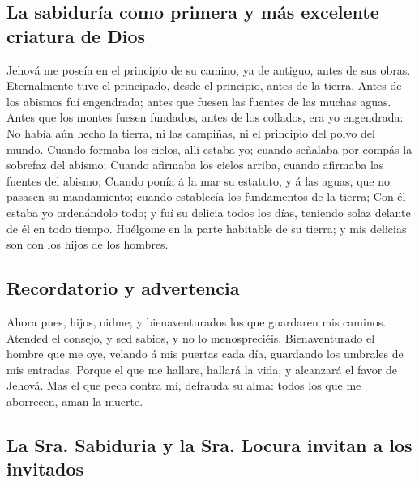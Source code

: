 \hypertarget{la-sabiduruxeda-como-primera-y-muxe1s-excelente-criatura-de-dios}{%
\subsection{La sabiduría como primera y más excelente criatura de
Dios}\label{la-sabiduruxeda-como-primera-y-muxe1s-excelente-criatura-de-dios}}

 Jehová me poseía en el principio de su camino, ya de
antiguo, antes de sus obras.  Eternalmente tuve el
principado, desde el principio, antes de la tierra. 
Antes de los abismos fuí engendrada; antes que fuesen las fuentes de las
muchas aguas.  Antes que los montes fuesen fundados,
antes de los collados, era yo engendrada:  No había aún
hecho la tierra, ni las campiñas, ni el principio del polvo del mundo.
 Cuando formaba los cielos, allí estaba yo; cuando
señalaba por compás la sobrefaz del abismo;  Cuando
afirmaba los cielos arriba, cuando afirmaba las fuentes del abismo;
 Cuando ponía á la mar su estatuto, y á las aguas, que no
pasasen su mandamiento; cuando establecía los fundamentos de la tierra;
 Con él estaba yo ordenándolo todo; y fuí su delicia
todos los días, teniendo solaz delante de él en todo tiempo.
 Huélgome en la parte habitable de su tierra; y mis
delicias son con los hijos de los hombres.

\hypertarget{recordatorio-y-advertencia}{%
\subsection{Recordatorio y
advertencia}\label{recordatorio-y-advertencia}}

 Ahora pues, hijos, oidme; y bienaventurados los que
guardaren mis caminos.  Atended el consejo, y sed sabios,
y no lo menospreciéis.  Bienaventurado el hombre que me
oye, velando á mis puertas cada día, guardando los umbrales de mis
entradas.  Porque el que me hallare, hallará la vida, y
alcanzará el favor de Jehová.  Mas el que peca contra mí,
defrauda su alma: todos los que me aborrecen, aman la muerte.

\hypertarget{la-sra.-sabiduria-y-la-sra.-locura-invitan-a-los-invitados}{%
\subsection{La Sra. Sabiduria y la Sra. Locura invitan a los
invitados}\label{la-sra.-sabiduria-y-la-sra.-locura-invitan-a-los-invitados}}

